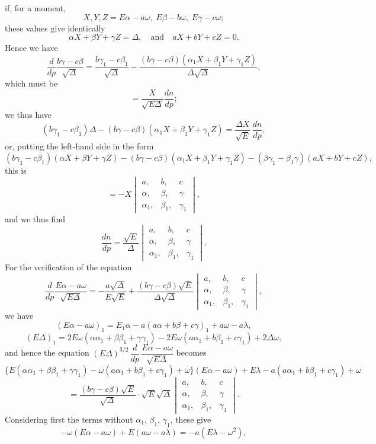 \documentclass[11pt]{article}
\begin{document}
if, for a moment,
\[
X, Y, Z = E\alpha-a\omega,\; E\beta-b\omega,\; E\gamma-c\omega;
\]
these values give identically
\[
\alpha X+\beta Y+\gamma Z = \Delta,\quad \text{and}\quad aX+bY+cZ = 0.
\]
Hence we have
\[
\frac{d}{dp}\frac{b\gamma-c\beta}{\sqrt{\Delta}} = \frac{b\gamma_1-c\beta_1}{\sqrt{\Delta}} - \frac{(b\gamma-c\beta)(\alpha_1 X+\beta_1 Y+\gamma_1 Z)}{\Delta\sqrt{\Delta}},
\]
which must be
\[
= \frac{X}{\sqrt{E\Delta}}\frac{dn}{dp};
\]
we thus have
\[
(b\gamma_1-c\beta_1)\Delta - (b\gamma-c\beta)(\alpha_1 X+\beta_1 Y+\gamma_1 Z) = \frac{\Delta X}{\sqrt{E}}\,\frac{dn}{dp},
\]
or, putting the left-hand side in the form
\[
(b\gamma_1-c\beta_1)(\alpha X+\beta Y+\gamma Z) - (b\gamma-c\beta)(\alpha_1 X+\beta_1 Y+\gamma_1 Z) - (\beta\gamma_1-\beta_1\gamma)(aX+bY+cZ),
\]
this is
\[
= -X \begin{vmatrix} a, & b, & c \\ \alpha, & \beta, & \gamma \\ \alpha_1, & \beta_1, & \gamma_1 \end{vmatrix},
\]
and we thus find
\[
\frac{dn}{dp} = \frac{\sqrt{E}}{\Delta}
\begin{vmatrix} a, & b, & c \\ \alpha, & \beta, & \gamma \\ \alpha_1, & \beta_1, & \gamma_1 \end{vmatrix}.
\]
For the verification of the equation
\[
\frac{d}{dp}\frac{E\alpha-a\omega}{\sqrt{E\Delta}} = -\frac{a\sqrt{\Delta}}{E\sqrt{E}} + \frac{(b\gamma-c\beta)\sqrt{E}}{\Delta\sqrt{\Delta}}
\begin{vmatrix} a, & b, & c \\ \alpha, & \beta, & \gamma \\ \alpha_1, & \beta_1, & \gamma_1 \end{vmatrix},
\]
we have
\[
(E\alpha-a\omega)_1 = E_1\alpha - a(a\alpha+b\beta+c\gamma)_1 + a\omega - a\lambda,
\]
\[
(E\Delta)_1 = 2E\omega(\alpha\alpha_1+\beta\beta_1+\gamma\gamma_1) - 2E\omega(a\alpha_1+b\beta_1+c\gamma_1) + 2\Delta\omega,
\]
and hence the equation $(E\Delta)^{3/2}\,\dfrac{d}{dp}\,\dfrac{E\alpha-a\omega}{\sqrt{E\Delta}}$ becomes
\[
\{E(\alpha\alpha_1+\beta\beta_1+\gamma\gamma_1) - \omega(a\alpha_1+b\beta_1+c\gamma_1) + \omega\}(E\alpha-a\omega) + E\lambda - a(a\alpha_1+b\beta_1+c\gamma_1) + \omega
\]
\[
= \frac{(b\gamma-c\beta)\sqrt{E}}{\sqrt{\Delta}}\cdot\sqrt{E}\sqrt{\Delta}
\begin{vmatrix} a, & b, & c \\ \alpha, & \beta, & \gamma \\ \alpha_1, & \beta_1, & \gamma_1 \end{vmatrix}.
\]
Considering first the terms without $\alpha_1$, $\beta_1$, $\gamma_1$, these give
\[
-\omega(E\alpha-a\omega) + E(a\omega-a\lambda) = -a(E\lambda-\omega^2),
\]
\end{document}
